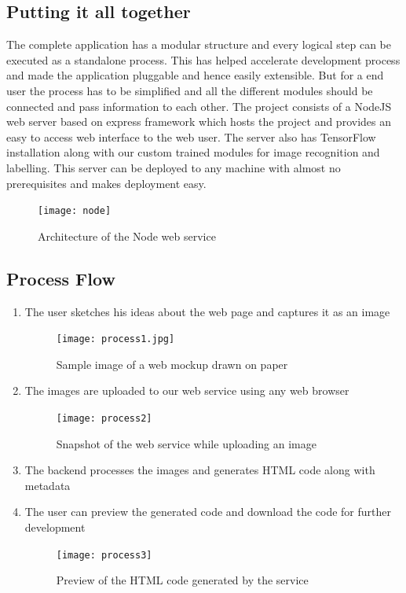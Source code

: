         \subsection{Putting it all together}
          The complete application has a modular structure and every logical step can be executed as a standalone process. This has helped accelerate development process and made the application pluggable and hence easily extensible. But for a end user the process has to be simplified and all the different modules should be connected and pass information to each other. The project consists of a NodeJS web server based on express framework which hosts the  project and provides an easy to access web interface to the web user. The server also has TensorFlow installation along with our custom trained modules for image recognition and labelling. This server can be deployed to any machine with almost no prerequisites and makes deployment easy.
          \begin{figure}
            \centering
            \texttt{[image: node]}
            \caption
            {Architecture of the Node web service}
          \end{figure}
        \subsection{Process Flow}
          \begin{enumerate}
            \item The user sketches his ideas about the web page and captures it as an image
            \begin{figure}[H]
              \centering
              \texttt{[image: process1.jpg]}
              \caption
              {Sample image of a web mockup drawn on paper}
            \end{figure}
            \item The images are uploaded to our web service using any web browser
            \begin{figure}[H]
              \centering
              \texttt{[image: process2]}
              \caption
              {Snapshot of the web service while uploading an image}
            \end{figure}
            \item The backend processes the images and generates HTML code along with metadata
            \item The user can preview the generated code and download the code for further development
            \begin{figure}[H]
              \centering
              \texttt{[image: process3]}
              \caption
              {Preview of the HTML code generated by the service}
            \end{figure}
          \end{enumerate}


